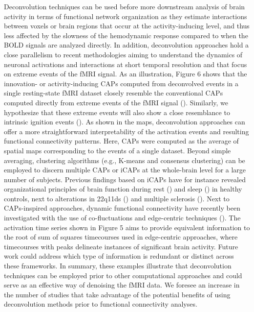 Deconvolution techniques can be used before more downstream analysis of brain activity in terms of functional network organization as they estimate interactions between voxels or brain regions that occur at the activity-inducing level, and thus less affected by the slowness of the hemodynamic response compared to when the BOLD signals are analyzed directly. In addition, deconvolution approaches hold a close parallelism to recent methodologies aiming to understand the dynamics of neuronal activations and interactions at short temporal resolution and that focus on extreme events of the fMRI signal. As an illustration, Figure 6 shows that the innovation- or activity-inducing CAPs computed from deconvolved events in a single resting-state fMRI dataset closely resemble the conventional CAPs computed directly from extreme events of the fMRI signal (\citealt{Liu2013Timevaryingfunctional,Liu2013Decompositionspontaneousbrain,Liu2018Coactivationpatterns,cifre2020revisiting,Cifre2020Furtherresultswhy,Zhang2020relationshipBOLDneural,Tagliazucchi2011,Tagliazucchi2012,Tagliazucchi2016,Rolls2021}). Similarly, we hypothesize that these extreme events will also show a close resemblance to intrinsic ignition events (\citealt{Deco2017a,Deco2017}). As shown in the maps, deconvolution approaches can offer a more straightforward interpretability of the activation events and resulting functional connectivity patterns. Here, CAPs were computed as the average of spatial maps corresponding to the events of a single dataset. Beyond simple averaging, clustering algorithms (e.g., K-means and consensus clustering) can be employed to discern multiple CAPs or iCAPs at the whole-brain level for a large number of subjects. Previous findings based on iCAPs have for instance revealed organizational principles of brain function during rest (\citealt{Karahanoglu2015Transientbrainactivity}) and sleep (\citealt{tarun2101}) in healthy controls, next to alterations in 22q11ds (\citealt{zoller1902}) and multiple sclerosis (\citealt{bommarito2101p}). Next to CAPs-inspired approaches, dynamic functional connectivity have recently been investigated with the use of co-fluctuations and edge-centric techniques (\citealt{Faskowitz2020,Esfahlani2020Highamplitudecofluctuations,Jo2021,Sporns2021,Oort2018}). The activation time series shown in Figure 5 aims to provide equivalent information to the root of sum of squares timecourses used in edge-centric approaches, where timecourses with peaks delineate instances of significant brain activity. Future work could address which type of information is redundant or distinct across these frameworks. In summary, these examples illustrate that deconvolution techniques can be employed prior to other computational approaches and could serve as an effective way of denoising the fMRI data. We foresee an increase in the number of studies that take advantage of the potential benefits of using deconvolution methods prior to functional connectivity analyses.

